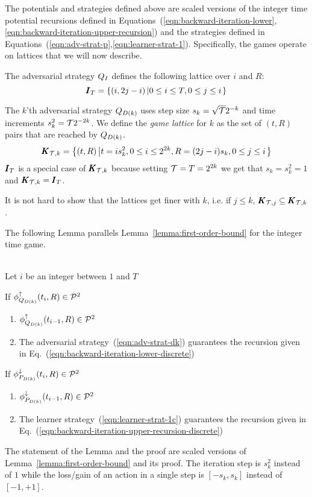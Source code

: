 \documentclass{article}[12pt]
\begin{document}
The potentials and strategies defined above are scaled versions of the
integer time potential recursions defined in
Equations~(\ref{eqn:backward-iteration-lower},\ref{eqn:backward-iteration-upper-recursion})
and the strategies defined in Equations~(\ref{eqn:adv-strat-p},\ref{eqn:learner-strat-1}). Specifically, the games operate on lattices that we will now describe.

The adversarial strategy $Q_I$ defines the following lattice over $i$ and $R$:
$$\pmb{I}_{T}=\left\{ (i,2j-i) \left| 0 \leq i \leq T, 0 \leq j \leq i\right. \right\}$$

The $k$'th adversarial strategy $Q_{D(k)}$ uses step size $s_k=\sqrt{\mathcal{T}} 2^{-k}$ and time
increments $s_k^2=\mathcal{T} 2^{-2k}$. We define the {\em game lattice}
for $k$ as the set of $(t,R)$ pairs that are reached by $Q_{D(k)}$.
\begin{equation}  \label{eqn:game-lattice}
  \pmb{K}_{{\mathcal{T},k}}=\left\{ (t,R) \left| t=i s_k^2, 0 \leq i \leq 2^{2k}, R=(2j-i)s_k, 0 \leq j \leq i\right. \right\}
  \end{equation}
$\pmb{I}_{T}$ is a special case of $\pmb{K}_{\mathcal{T},k}$ because setting
$\mathcal{T}=T=2^{2k}$ we get that $s_k=s_k^2=1$ and  $\pmb{K}_{\mathcal{T},k} = \pmb{I}_{T}$.

It is not hard to show that the lattices get finer with $k$, i.e. if  $j \leq k$,  $\pmb{K}_{\mathcal{T},j} \subseteq \pmb{K}_{\mathcal{T},k}$.


The following Lemma parallels Lemma~\ref{lemma:first-order-bound} for the integer time game.
\begin{lemma} \label{lemma:discrete-step-bound}
~\\
Let $i$ be an integer between $1$ and $T$

If $\phi_{Q_{D(k)}}^{\uparrow}(t_i,R) \in {\cal P}^{2}$
\begin{enumerate}
\item  $\phi_{Q_{D(k)}}^{\uparrow}(t_{i-1},R) \in {\cal P}^{2}$
\item The adversarial strategy~(\ref{eqn:adv-strat-dk})
  guarantees the recursion given in Eq.~(\ref{eqn:backward-iteration-lower-discrete})
\end{enumerate}

If $\phi_{P_{D(k)}}^{\downarrow}(t_i,R) \in {\cal P}^{2}$
\begin{enumerate}
\item $\phi_{P_{D(k)}}^{\downarrow}(t_{i-1},R) \in {\cal P}^{2}$
\item The learner strategy~(\ref{eqn:learner-strat-1c})
  guarantees the recursion given in Eq.~(\ref{eqn:backward-iteration-upper-recursion-discrete})
\end{enumerate}

\end{lemma}
\proof
The statement of the Lemma and the proof are scaled versions of
Lemma~\ref{lemma:first-order-bound} and its proof. The iteration step
is $s_k^2$ instead of $1$ while the loss/gain of an action in a single
step is $[-s_k,s_k]$ instead of $[-1,+1]$.
\end{document}
